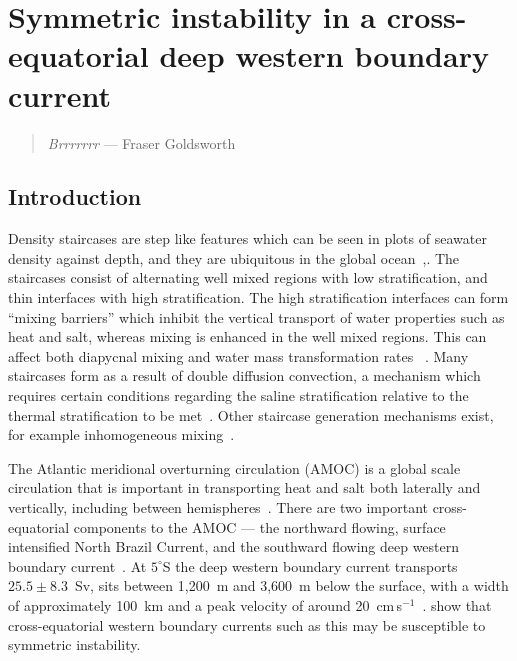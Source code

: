 \chapter{Symmetric instability in a cross-equatorial deep western boundary current}
\begin{quote}
    \textit{Brrrrrrr} --- Fraser Goldsworth
\end{quote}

\section{Introduction}
Density staircases are step like features which can be seen in plots of seawater density against depth, and they are ubiquitous in the global ocean~\cite{Stern1960,Schmitt1987,Melling1984,Tait1968,Johannessen1974,Lambert1977},. The staircases consist of alternating well mixed regions with low stratification, and thin interfaces with high stratification. The high stratification interfaces can form ``mixing barriers'' which inhibit the vertical transport of water properties such as heat and salt, whereas mixing is enhanced in the well mixed regions. This can affect both diapycnal mixing and water mass transformation rates ~\cite{Schmitt2005}. Many staircases form as a result of double diffusion convection, a mechanism which requires certain conditions regarding the saline stratification relative to the thermal stratification to be met~\cite{Merryfield2000}. Other staircase generation mechanisms exist, for example inhomogeneous mixing~\cite{Balmforth1998}.

The Atlantic meridional overturning circulation (AMOC) is a global scale circulation that is important in transporting heat and salt both laterally and vertically, including between hemispheres~\cite{Jackson2015}. There are two important cross-equatorial components to the AMOC --- the northward flowing, surface intensified North Brazil Current, and the southward flowing deep western boundary current~\cite{Bower2019}. At $5^\circ$S the deep western boundary current transports $25.5 \pm 8.3$~Sv, sits between 1,200~m and 3,600~m below the surface, with a width of approximately 100~km and a peak velocity of around 20~cm$\,$s$^{-1}$~\cite{Schott2005}. \citet{Goldsworth2021} show that cross-equatorial western boundary currents such as this may be susceptible to symmetric instability.

